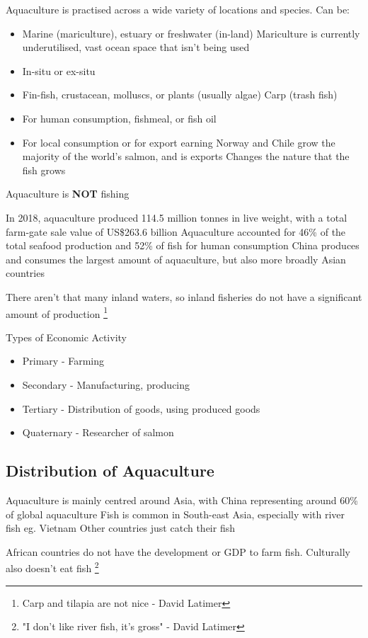	Aquaculture is practised across a wide variety of locations and species. Can be:
	\begin{itemize}
		\item Marine (mariculture), estuary or freshwater (in-land)
			\subitem Mariculture is currently underutilised, vast ocean space that isn't being used
		\item In-situ or ex-situ
		\item Fin-fish, crustacean, molluscs, or plants (usually algae)
			\subitem Carp (trash fish)
		\item For human consumption, fishmeal, or fish oil
		\item For local consumption or for export earning
			\subitem Norway and Chile grow the majority of the world's salmon, and is exports
			\subitem Changes the nature that the fish grows
	\end{itemize}

	Aquaculture is \textbf{NOT} fishing

	 In 2018, aquaculture produced 114.5 million tonnes in live weight, with a total farm-gate sale value of US\$263.6 billion
	Aquaculture accounted for 46\% of the total seafood production and 52\% of fish for human consumption
	China produces and consumes the largest amount of aquaculture, but also more broadly Asian countries

	There aren't that many inland waters, so inland fisheries do not have a significant amount of production \footnote{Carp and tilapia are not nice - David Latimer}

	Types of Economic Activity
	\begin{itemize}
		\item Primary - Farming
		\item Secondary - Manufacturing, producing
		\item Tertiary - Distribution of goods, using produced goods
		\item Quaternary - Researcher of salmon
	\end{itemize}

	\subsection{Distribution of Aquaculture}
		Aquaculture is mainly centred around Asia, with China representing around 60\% of global aquaculture
		Fish is common in South-east Asia, especially with river fish eg. Vietnam
		Other countries just catch their fish

		African countries do not have the development or GDP to farm fish. Culturally also doesn't eat fish
		\footnote{"I don't like river fish, it's gross" - David Latimer}


